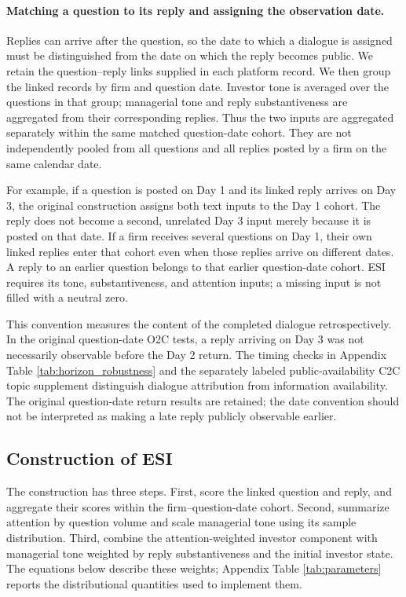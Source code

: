 \documentclass[12pt]{article}
\begin{document}
\paragraph{Matching a question to its reply and assigning the observation date.}
Replies can arrive after the question, so the date to which a dialogue is assigned must be distinguished from the date on which the reply becomes public. We retain the question--reply links supplied in each platform record. We then group the linked records by firm and question date. Investor tone is averaged over the questions in that group; managerial tone and reply substantiveness are aggregated from their corresponding replies. Thus the two inputs are aggregated separately within the same matched question-date cohort. They are not independently pooled from all questions and all replies posted by a firm on the same calendar date.

For example, if a question is posted on Day 1 and its linked reply arrives on Day 3, the original construction assigns both text inputs to the Day 1 cohort. The reply does not become a second, unrelated Day 3 input merely because it is posted on that date. If a firm receives several questions on Day 1, their own linked replies enter that cohort even when those replies arrive on different dates. A reply to an earlier question belongs to that earlier question-date cohort. ESI requires its tone, substantiveness, and attention inputs; a missing input is not filled with a neutral zero.

This convention measures the content of the completed dialogue retrospectively. In the original question-date O2C tests, a reply arriving on Day 3 was not necessarily observable before the Day 2 return. The timing checks in Appendix Table \ref{tab:horizon_robustness} and the separately labeled public-availability C2C topic supplement distinguish dialogue attribution from information availability. The original question-date return results are retained; the date convention should not be interpreted as making a late reply publicly observable earlier.

\subsection{Construction of ESI}\label{sec:esi_construction}

The construction has three steps. First, score the linked question and reply, and aggregate their scores within the firm--question-date cohort. Second, summarize attention by question volume and scale managerial tone using its sample distribution. Third, combine the attention-weighted investor component with managerial tone weighted by reply substantiveness and the initial investor state. The equations below describe these weights; Appendix Table \ref{tab:parameters} reports the distributional quantities used to implement them.
\end{document}
